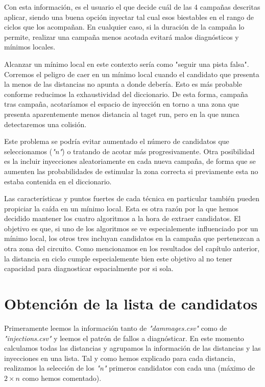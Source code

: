 Con esta información, es el usuario el que decide cuál de las 4 campañas descritas
aplicar, siendo una buena opción inyectar tal cual esos biestables en el rango de
ciclos que los acompañan. En cualquier caso, si la duración de la campaña lo
permite, realizar una campaña menos acotada evitará malos diagnósticos y mínimos
locales.

Alcanzar un mínimo local en este contexto sería como "seguir una pista falsa".
Corremos el peligro de caer en un mínimo local cuando el candidato que presenta la
menos de las distancias no apunta a donde debería. Esto es más probable conforme
reducimos la exhaustividad del diccionario. De esta forma, campaña tras campaña,
acotaríamos el espacio de inyección en torno a una zona que presenta aparentemente
menos distancia al taget run, pero en la que nunca detectaremos una colisión. 

Este problema se podría evitar aumentado el número de candidatos que seleccionamos
(\textit{"n"}) o tratando de acotar más progresivamente. Otra posibilidad es la
incluir inyecciones aleatoriamente en cada nueva campaña, de forma que se aumenten
las probabilidades de estimular la zona correcta si previamente esta no estaba
contenida en el diccionario.

Las características y puntos fuertes de cada técnica en particular también pueden
propiciar la caída en un mínimo local. Esta es otra razón por la que hemos
decidido mantener los cuatro algoritmos a la hora de extraer candidatos. El
objetivo es que, si uno de los algoritmos se ve especialemente influenciado por un
mínimo local, los otros tres incluyan candidatos en la campaña que pertenezcan a
otra zona del circuito. Como mencionamos en los resultados del capítulo anterior,
la distancia en ciclo cumple especialemente bien este objetivo al no tener
capacidad para diagnosticar espacialmente por si sola.

\section{Obtención de la lista de candidatos}
\label{sec:Candidatos}
Primeramente leemos la información tanto de \textit{"dammages.csv"} como de 
\textit{"injections.csv"} y leemos el patrón de fallos a diagnósticar. En este
momento calculamos todas las distancias y agrupamos la información de las
distancias y las inyecciones en una lista. Tal y como hemos explicado para cada
distancia, realizamos la selección de los \textit{"n"} primeros candidatos con
cada una (máximo de $2 \times n$ como hemos comentado).

